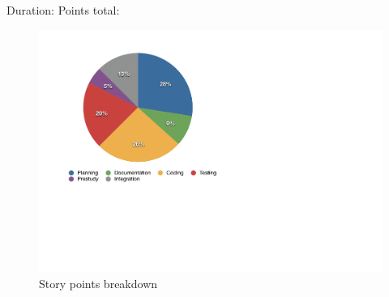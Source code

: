 Duration:
Points total:

\begin{figure}[h!]
\centering \includegraphics[scale=0.8]{img/pie_chart.pdf}
\caption{Story points breakdown}
\label{fig:sprints-points}
\end{figure}
